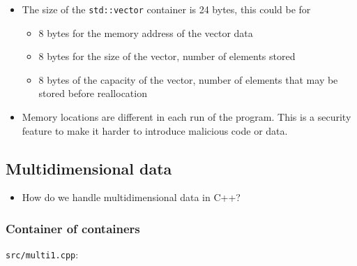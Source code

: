 \documentclass[12pt,letterpaper,twoside]{article}
\begin{document}
\begin{itemize}
\item
  The size of the \texttt{std::vector} container is 24 bytes, this could
  be for

  \begin{itemize}
  \item
    8 bytes for the memory address of the vector data
  \item
    8 bytes for the size of the vector, number of elements stored
  \item
    8 bytes of the capacity of the vector, number of elements that may
    be stored before reallocation
  \end{itemize}
\item
  Memory locations are different in each run of the program. This is a
  security feature to make it harder to introduce malicious code or
  data.
\end{itemize}

\hypertarget{multidimensional-data}{%
\subsection{Multidimensional data}\label{multidimensional-data}}

\begin{itemize}
\tightlist
\item
  How do we handle multidimensional data in C++?
\end{itemize}

\hypertarget{container-of-containers}{%
\subsubsection{Container of containers}\label{container-of-containers}}

\texttt{src/multi1.cpp}:
\end{document}
